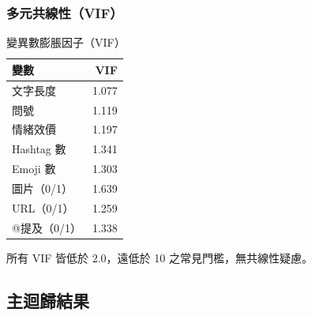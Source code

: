 \documentclass[12pt,a4paper]{ctexart}
\begin{document}
\subsubsection{多元共線性（VIF）}

\begin{table}[H]
\centering
\caption{變異數膨脹因子（VIF）}
\small
\begin{tabular}{lr}
\toprule
變數 & VIF \\
\midrule
文字長度 & 1.077 \\
問號 & 1.119 \\
情緒效價 & 1.197 \\
Hashtag 數 & 1.341 \\
Emoji 數 & 1.303 \\
圖片（0/1）& 1.639 \\
URL（0/1）& 1.259 \\
@提及（0/1）& 1.338 \\
\bottomrule
\end{tabular}
\end{table}

所有 VIF 皆低於 2.0，遠低於 10 之常見門檻，無共線性疑慮。

\subsection{主迴歸結果}
\end{document}
